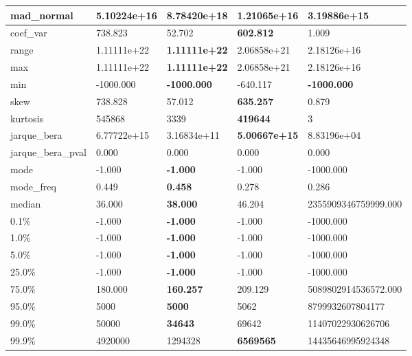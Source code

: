 \begin{table}[H]
\begin{tabular}{|l|m{10em}|m{10em}|m{10em}|m{10em}|}
\hline mad\_normal & 5.10224e+16 & \cellcolor[rgb]{0.9, 0.54, 0.52} 8.78420e+18 & \bfseries 1.21065e+16 & 3.19886e+15 \\
\hline coef\_var & 738.823 & 52.702 & \bfseries 602.812 & \cellcolor[rgb]{0.9, 0.54, 0.52} 1.009 \\
\hline range & 1.11111e+22 & \bfseries 1.11111e+22 & 2.06858e+21 & \cellcolor[rgb]{0.9, 0.54, 0.52} 2.18126e+16 \\
\hline max & 1.11111e+22 & \bfseries 1.11111e+22 & 2.06858e+21 & \cellcolor[rgb]{0.9, 0.54, 0.52} 2.18126e+16 \\
\hline min & -1000.000 & \bfseries -1000.000 & \cellcolor[rgb]{0.9, 0.54, 0.52} -640.117 & \bfseries -1000.000 \\
\hline skew & 738.828 & 57.012 & \bfseries 635.257 & \cellcolor[rgb]{0.9, 0.54, 0.52} 0.879 \\
\hline kurtosis & 545868 & 3339 & \bfseries 419644 & \cellcolor[rgb]{0.9, 0.54, 0.52} 3 \\
\hline jarque\_bera & 6.77722e+15 & 3.16834e+11 & \bfseries 5.00667e+15 & \cellcolor[rgb]{0.9, 0.54, 0.52} 8.83196e+04 \\
\hline jarque\_bera\_pval & 0.000 & 0.000 & 0.000 & 0.000 \\
\hline mode & -1.000 & \bfseries -1.000 & -1.000 & \cellcolor[rgb]{0.9, 0.54, 0.52} -1000.000 \\
\hline mode\_freq & 0.449 & \bfseries 0.458 & \cellcolor[rgb]{0.9, 0.54, 0.52} 0.278 & 0.286 \\
\hline median & 36.000 & \bfseries 38.000 & 46.204 & \cellcolor[rgb]{0.9, 0.54, 0.52} 2355909346759999.000 \\
\hline 0.1\% & -1.000 & \bfseries -1.000 & -1.000 & \cellcolor[rgb]{0.9, 0.54, 0.52} -1000.000 \\
\hline 1.0\% & -1.000 & \bfseries -1.000 & -1.000 & \cellcolor[rgb]{0.9, 0.54, 0.52} -1000.000 \\
\hline 5.0\% & -1.000 & \bfseries -1.000 & -1.000 & \cellcolor[rgb]{0.9, 0.54, 0.52} -1000.000 \\
\hline 25.0\% & -1.000 & \bfseries -1.000 & -1.000 & \cellcolor[rgb]{0.9, 0.54, 0.52} -1000.000 \\
\hline 75.0\% & 180.000 & \bfseries 160.257 & 209.129 & \cellcolor[rgb]{0.9, 0.54, 0.52} 5089802914536572.000 \\
\hline 95.0\% & 5000 & \bfseries 5000 & 5062 & \cellcolor[rgb]{0.9, 0.54, 0.52} 8799932607804177 \\
\hline 99.0\% & 50000 & \bfseries 34643 & 69642 & \cellcolor[rgb]{0.9, 0.54, 0.52} 11407022930626706 \\
\hline 99.9\% & 4920000 & 1294328 & \bfseries 6569565 & \cellcolor[rgb]{0.9, 0.54, 0.52} 14435646995924348 \\
\hline
\end{tabular}
\end{table}
